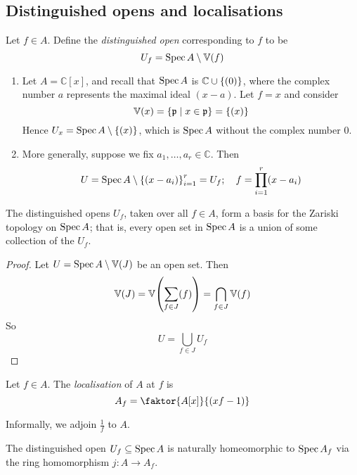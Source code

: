 \subsection{Distinguished opens and localisations}
\begin{definition}
    Let \( f \in A \).
    Define the \emph{distinguished open} corresponding to \( f \) to be
    \[ U_f = \operatorname{Spec} A \setminus \mathbb V(f) \]
\end{definition}
\begin{example}
    \begin{enumerate}
        \item Let \( A = \mathbb C[x] \), and recall that \( \operatorname{Spec} A \) is \( \mathbb C \cup \qty{(0)} \), where the complex number \( a \) represents the maximal ideal \( (x - a) \).
        Let \( f = x \) and consider
        \[ \mathbb V(x) = \qty{\mathfrak p \mid x \in \mathfrak p} = \qty{(x)} \]
        Hence \( U_x = \operatorname{Spec} A \setminus \qty{(x)} \), which is \( \operatorname{Spec} A \) without the complex number 0.
        \item More generally, suppose we fix \( a_1, \dots, a_r \in \mathbb C \).
        Then
        \[ U = \operatorname{Spec} A \setminus \qty{(x - a_i)}_{i=1}^r = U_f;\quad f = \prod_{i=1}^r (x-a_i) \]
    \end{enumerate}
\end{example}
\begin{lemma}
    The distinguished opens \( U_f \), taken over all \( f \in A \), form a basis for the Zariski topology on \( \operatorname{Spec} A \); that is, every open set in \( \operatorname{Spec} A \) is a union of some collection of the \( U_f \).
\end{lemma}
\begin{proof}
    Let \( U = \operatorname{Spec} A \setminus \mathbb V(J) \) be an open set.
    Then
    \[ \mathbb V(J) = \mathbb V\qty(\sum_{f \in J} (f)) = \bigcap_{f \in J} \mathbb V(f) \]
    So
    \[ U = \bigcup_{f \in J} U_f \]
\end{proof}
\begin{definition}
    Let \( f \in A \).
    The \emph{localisation} of \( A \) at \( f \) is
    \[ A_f = \faktor{A[x]}{(xf - 1)} \]
\end{definition}
Informally, we adjoin \( \frac{1}{f} \) to \( A \).
\begin{lemma}
    The distinguished open \( U_f \subseteq \operatorname{Spec} A \) is naturally homeomorphic to \( \operatorname{Spec} A_f \) via the ring homomorphism \( j : A \to A_f \).
\end{lemma}
